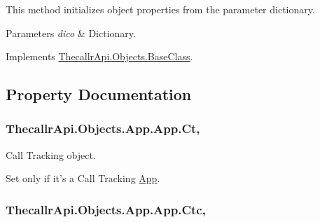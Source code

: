 This method initializes object properties from the parameter dictionary. 


\begin{DoxyParams}{Parameters}
{\em dico} & Dictionary.\\
\hline
\end{DoxyParams}


Implements \hyperlink{class_thecallr_api_1_1_objects_1_1_base_class_a77680f2cb89665fe65039581c7d907d2}{Thecallr\+Api.\+Objects.\+Base\+Class}.



\subsection{Property Documentation}
\hypertarget{class_thecallr_api_1_1_objects_1_1_app_1_1_app_aeb2ee2fb35ab7f407044a0a3a3dcffa3}{
\subsubsection[{Ct}]{ Thecallr\+Api.\+Objects.\+App.\+App.\+Ct\hspace{0.3cm}{\ttfamily [get]}, {\ttfamily [set]}}}\label{class_thecallr_api_1_1_objects_1_1_app_1_1_app_aeb2ee2fb35ab7f407044a0a3a3dcffa3}


Call Tracking object. 

Set only if it's a Call Tracking \hyperlink{class_thecallr_api_1_1_objects_1_1_app_1_1_app}{App}.\hypertarget{class_thecallr_api_1_1_objects_1_1_app_1_1_app_a8b2f7a421d464397e30431761bfae2c5}{
\subsubsection[{Ctc}]{ Thecallr\+Api.\+Objects.\+App.\+App.\+Ctc\hspace{0.3cm}{\ttfamily [get]}, {\ttfamily [set]}}}\label{class_thecallr_api_1_1_objects_1_1_app_1_1_app_a8b2f7a421d464397e30431761bfae2c5}


